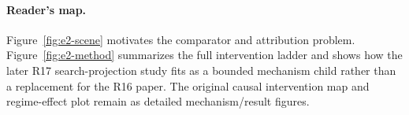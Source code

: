 \paragraph{Reader's map.} Figure~\ref{fig:e2-scene} motivates the comparator and attribution problem. Figure~\ref{fig:e2-method} summarizes the full intervention ladder and shows how the later R17 search-projection study fits as a bounded mechanism child rather than a replacement for the R16 paper. The original causal intervention map and regime-effect plot remain as detailed mechanism/result figures.
